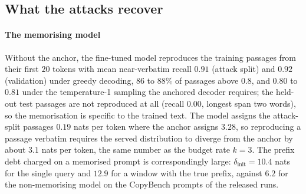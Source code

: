 \subsection{What the attacks recover}\label{sec:attack-results}

\paragraph{The memorising model}
Without the anchor, the fine-tuned model reproduces the training passages from their first $20$ tokens with mean near-verbatim recall $0.91$ (attack split) and $0.92$ (validation) under greedy decoding, $86$ to $88\%$ of passages above $0.8$, and $0.80$ to $0.81$ under the temperature-1 sampling the anchored decoder requires; the held-out test passages are not reproduced at all (recall $0.00$, longest span two words), so the memorisation is specific to the trained text. The model assigns the attack-split passages $0.19$ nats per token where the anchor assigns $3.28$, so reproducing a passage verbatim requires the served distribution to diverge from the anchor by about $3.1$ nats per token, the same number as the budget rate $k=3$. The prefix debt charged on a memorised prompt is correspondingly large: $\delta_{\mathrm{init}} = 10.4$ nats for the single query and $12.9$ for a window with the true prefix, against $6.2$ for the non-memorising model on the CopyBench prompts of the released runs.

